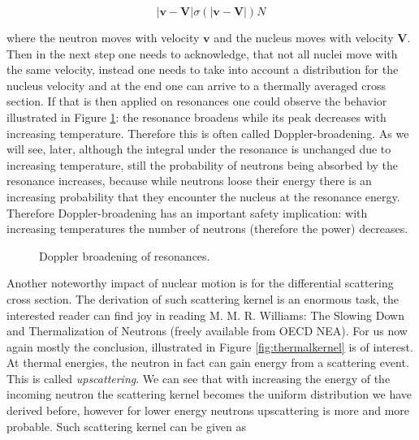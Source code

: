 \begin{equation}
|\textbf{v}-\textbf{V}|\sigma(|\textbf{v}-\textbf{V}|)N
\end{equation}

\noindent where the neutron moves with velocity $\textbf{v}$ and the nucleus moves with velocity $\textbf{V}$. Then in the next step one needs to acknowledge, that not all nuclei move with the same velocity, instead one needs to take into account a distribution for the nucleus velocity and at the end one can arrive to a thermally averaged cross section. If that is then applied on  resonances one could observe the behavior illustrated in Figure \ref{fig:doppler}: the resonance broadens while its peak decreases with increasing temperature. Therefore this is often called Doppler-broadening. As we will see, later, although the integral under the resonance is unchanged due to increasing temperature, still the probability of neutrons being absorbed by the resonance increases, because while neutrons loose their energy there is an increasing probability that they encounter the nucleus at the resonance energy. Therefore Doppler-broadening has an important safety implication: with increasing temperatures the number of neutrons (therefore the power) decreases.

\begin{figure}[ht!]
\protect {}\protect
\caption{\label{fig:doppler} \footnotesize{Doppler broadening of resonances.}}
\end{figure}

Another noteworthy impact of nuclear motion is for the differential scattering cross section. The derivation of such scattering kernel is an enormous task, the interested reader can find joy in reading M. M. R. Williams:  The Slowing Down and Thermalization of Neutrons (freely available from OECD NEA). For us now again mostly the conclusion, illustrated in Figure \ref{fig:thermalkernel} is of interest. At thermal energies, the neutron in fact can gain energy from a scattering event. This is called \textit{upscattering}. We can see that with increasing the energy of the incoming neutron the scattering kernel becomes the uniform distribution we have derived before, however for lower energy neutrons upscattering is more and more probable. Such scattering kernel can be given as


